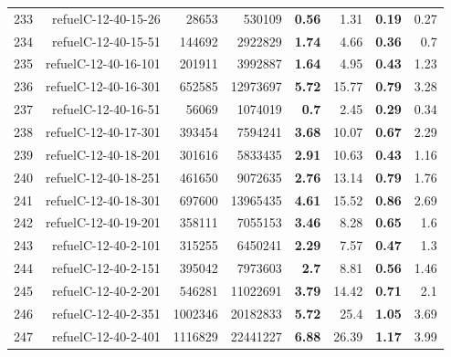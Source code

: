 \begin{longtable}{lrr@{\hskip 12pt}r@{\hskip 12pt}r@{\hskip 12pt}r@{\hskip 12pt}r@{\hskip 12pt}r}
233 & \multirow{1}{*}{refuelC-12-40-15-26} & \multirow{1}{*}{28653} & \multirow{1}{*}{530109} & \textbf{0.56} & 1.31 & \textbf{0.19} & 0.27 \\
234 & \multirow{1}{*}{refuelC-12-40-15-51} & \multirow{1}{*}{144692} & \multirow{1}{*}{2922829} & \textbf{1.74} & 4.66 & \textbf{0.36} & 0.7 \\
235 & \multirow{1}{*}{refuelC-12-40-16-101} & \multirow{1}{*}{201911} & \multirow{1}{*}{3992887} & \textbf{1.64} & 4.95 & \textbf{0.43} & 1.23 \\
236 & \multirow{1}{*}{refuelC-12-40-16-301} & \multirow{1}{*}{652585} & \multirow{1}{*}{12973697} & \textbf{5.72} & 15.77 & \textbf{0.79} & 3.28 \\
237 & \multirow{1}{*}{refuelC-12-40-16-51} & \multirow{1}{*}{56069} & \multirow{1}{*}{1074019} & \textbf{0.7} & 2.45 & \textbf{0.29} & 0.34 \\
238 & \multirow{1}{*}{refuelC-12-40-17-301} & \multirow{1}{*}{393454} & \multirow{1}{*}{7594241} & \textbf{3.68} & 10.07 & \textbf{0.67} & 2.29 \\
239 & \multirow{1}{*}{refuelC-12-40-18-201} & \multirow{1}{*}{301616} & \multirow{1}{*}{5833435} & \textbf{2.91} & 10.63 & \textbf{0.43} & 1.16 \\
240 & \multirow{1}{*}{refuelC-12-40-18-251} & \multirow{1}{*}{461650} & \multirow{1}{*}{9072635} & \textbf{2.76} & 13.14 & \textbf{0.79} & 1.76 \\
241 & \multirow{1}{*}{refuelC-12-40-18-301} & \multirow{1}{*}{697600} & \multirow{1}{*}{13965435} & \textbf{4.61} & 15.52 & \textbf{0.86} & 2.69 \\
242 & \multirow{1}{*}{refuelC-12-40-19-201} & \multirow{1}{*}{358111} & \multirow{1}{*}{7055153} & \textbf{3.46} & 8.28 & \textbf{0.65} & 1.6 \\
243 & \multirow{1}{*}{refuelC-12-40-2-101} & \multirow{1}{*}{315255} & \multirow{1}{*}{6450241} & \textbf{2.29} & 7.57 & \textbf{0.47} & 1.3 \\
244 & \multirow{1}{*}{refuelC-12-40-2-151} & \multirow{1}{*}{395042} & \multirow{1}{*}{7973603} & \textbf{2.7} & 8.81 & \textbf{0.56} & 1.46 \\
245 & \multirow{1}{*}{refuelC-12-40-2-201} & \multirow{1}{*}{546281} & \multirow{1}{*}{11022691} & \textbf{3.79} & 14.42 & \textbf{0.71} & 2.1 \\
246 & \multirow{1}{*}{refuelC-12-40-2-351} & \multirow{1}{*}{1002346} & \multirow{1}{*}{20182833} & \textbf{5.72} & 25.4 & \textbf{1.05} & 3.69 \\
247 & \multirow{1}{*}{refuelC-12-40-2-401} & \multirow{1}{*}{1116829} & \multirow{1}{*}{22441227} & \textbf{6.88} & 26.39 & \textbf{1.17} & 3.99 \\

\end{longtable}
